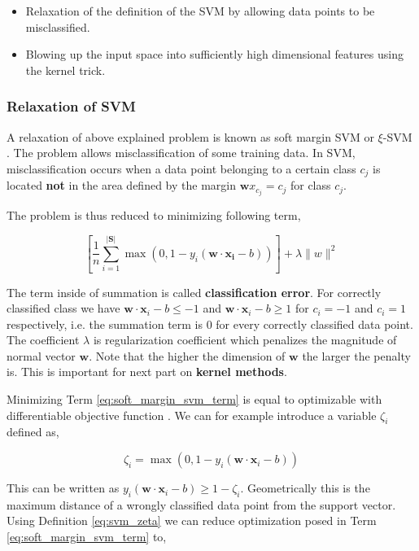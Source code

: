\documentclass[pdftex,12pt,a4paper]{report}
\begin{document}
\begin{itemize}
\item Relaxation of the definition of the SVM by allowing data points to be misclassified.
\item Blowing up the input space into sufficiently high dimensional features using the kernel trick.
\end{itemize}

\subsubsection*{Relaxation of SVM}

A relaxation of above explained problem is known as soft margin SVM or $\xi$-SVM \cite{cortes1995support}. The problem allows misclassification of some training data. In SVM, misclassification occurs when a data point belonging to a certain class $c_j$ is located \textbf{not} in the area defined by the margin $\mathbf{w} x_{c_j} = c_j$ for class $c_j$.

The problem is thus reduced to minimizing following term,

\begin{equation}
\left[\frac{1}{n} \sum_{i=1}^{\vert \mathbf{S} \vert} \max\left(0, 1 - y_i(\mathbf{w} \cdot \mathbf{x_i} - b)\right) \right] + \lambda\| w \|^2
\label{eq:soft_margin_svm_term}
\end{equation}

The term inside of summation is called \textbf{classification error}. For correctly classified class we have $\mathbf{w} \cdot \mathbf{x}_i - b \leq -1$ and $\mathbf{w} \cdot \mathbf{x}_i - b \geq 1$ for $c_i = -1$ and $c_i = 1$ respectively, i.e. the summation term is $0$ for every correctly classified data point. The coefficient $\lambda$ is regularization coefficient which penalizes the magnitude of normal vector $\mathbf{w}$. Note that the higher the dimension of $\mathbf{w}$ the larger the penalty is. This is important for next part on \textbf{kernel methods}.

Minimizing Term \ref{eq:soft_margin_svm_term} is equal to optimizable with differentiable objective function \cite{nocedal2006numerical}. We can for example introduce a variable $\zeta_i$ defined as,

\begin{equation}
\zeta_i = \max(0, 1 - y_i(\mathbf{w} \cdot \mathbf{x}_i - b))
\label{eq:svm_zeta}
\end{equation}

This can be written as $y_i(\mathbf{w} \cdot \mathbf{x}_i - b) \geq 1 - \zeta_i$. Geometrically this is the maximum distance of a wrongly classified data point from the support vector. Using Definition \ref{eq:svm_zeta} we can reduce optimization posed in Term \ref{eq:soft_margin_svm_term} to,
\end{document}
